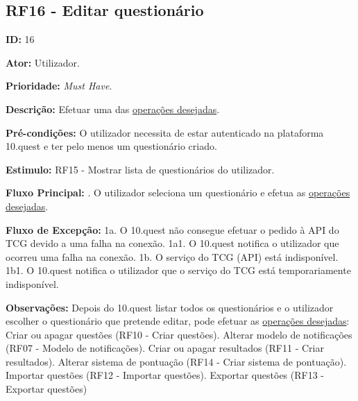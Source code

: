 \subsection{RF16 - Editar questionário}
	\item[--] \textbf{ID:} 16
	\item[--]  \textbf{Ator:} Utilizador.
	\item[--]  \textbf{Prioridade:} \textit{Must Have}.
	\item[--]  \textbf{Descrição:} Efetuar uma das \underline{operações desejadas}.
	\item[--]  \textbf{Pré-condições:} O utilizador necessita de estar autenticado na plataforma 10.quest e ter pelo menos um questionário criado.
	\item[--]  \textbf{Estimulo:} RF15 - Mostrar lista de questionários do utilizador.
	\item[--]  \textbf{Fluxo Principal:} 
		. O utilizador seleciona um questionário e efetua as \underline{operações desejadas}.
	\item[--]  \textbf{Fluxo de Excepção:} 
		\subitem 1a. O 10.quest não consegue efetuar o pedido à API do TCG devido a uma falha na conexão.
		\subitem 1a1. O 10.quest notifica o utilizador que ocorreu uma falha na conexão.
		\subitem 1b. O serviço do TCG (API) está indisponível.
		\subitem 1b1. O 10.quest notifica o utilizador que o serviço do TCG está temporariamente indisponível. 
	\item[--]  \textbf{Observações:} Depois do 10.quest listar todos os questionários e o utilizador escolher o questionário que pretende editar, pode efetuar as \underline{operações desejadas}:
		\subitem Criar ou apagar questões (RF10 - Criar questões).
		\subitem Alterar modelo de notificações (RF07 - Modelo de notificações).
		\subitem Criar ou apagar resultados (RF11 - Criar resultados).
		\subitem Alterar sistema de pontuação (RF14 - Criar sistema de pontuação).
		\subitem Importar questões (RF12 - Importar questões).
		\subitem Exportar questões (RF13 - Exportar questões)

\newpage


